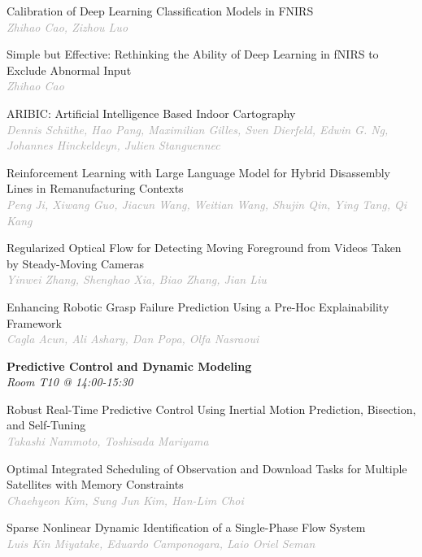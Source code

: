\begin{multicols*}{2}
\small Calibration of Deep Learning Classification Models in FNIRS\\ 
\footnotesize \textcolor{darkgray}{\textit{Zhihao Cao, Zizhou  Luo}}

\small Simple but Effective: Rethinking the Ability of Deep Learning in fNIRS to Exclude Abnormal Input\\ 
\footnotesize \textcolor{darkgray}{\textit{Zhihao Cao}}

\small ARIBIC: Artificial Intelligence Based Indoor Cartography\\ 
\footnotesize \textcolor{darkgray}{\textit{Dennis Schüthe, Hao  Pang, Maximilian  Gilles, Sven  Dierfeld, Edwin G.  Ng, Johannes  Hinckeldeyn, Julien  Stanguennec}}

\small Reinforcement Learning with Large Language Model for Hybrid Disassembly Lines in Remanufacturing Contexts\\ 
\footnotesize \textcolor{darkgray}{\textit{Peng Ji, Xiwang  Guo, Jiacun  Wang, Weitian  Wang, Shujin  Qin, Ying  Tang, Qi  Kang}}

\small Regularized Optical Flow for Detecting Moving Foreground from Videos Taken by Steady-Moving Cameras\\ 
\footnotesize \textcolor{darkgray}{\textit{Yinwei Zhang, Shenghao  Xia, Biao  Zhang, Jian  Liu}}

\small Enhancing Robotic Grasp Failure Prediction Using a Pre-Hoc Explainability Framework\\ 
\footnotesize \textcolor{darkgray}{\textit{Cagla Acun, Ali  Ashary, Dan  Popa, Olfa  Nasraoui}}

\normalsize \textbf{Predictive Control and Dynamic Modeling}\\
\small \textit{Room T10 @ 14:00-15:30}

\small Robust Real-Time Predictive Control Using Inertial Motion Prediction, Bisection, and Self-Tuning\\ 
\footnotesize \textcolor{darkgray}{\textit{Takashi Nammoto, Toshisada  Mariyama}}

\small Optimal Integrated Scheduling of Observation and Download Tasks for Multiple Satellites with Memory Constraints\\ 
\footnotesize \textcolor{darkgray}{\textit{Chaehyeon Kim, Sung Jun  Kim, Han-Lim  Choi}}

\small Sparse Nonlinear Dynamic Identification of a Single-Phase Flow System\\ 
\footnotesize \textcolor{darkgray}{\textit{Luis Kin Miyatake, Eduardo  Camponogara, Laio Oriel  Seman}}


\end{multicols*}
